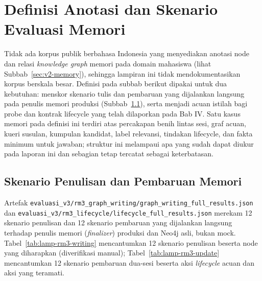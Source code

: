 \section{Definisi Anotasi dan Skenario Evaluasi Memori}
\label{lamp:v2-memory-gold}

Tidak ada korpus publik berbahasa Indonesia yang menyediakan anotasi node dan relasi \textit{knowledge graph} memori pada domain mahasiswa (lihat Subbab~\ref{sec:v2-memory}), sehingga lampiran ini tidak mendokumentasikan korpus berskala besar. Definisi pada subbab berikut dipakai untuk dua kebutuhan: menskor skenario tulis dan pembaruan yang dijalankan langsung pada penulis memori produksi (Subbab~\ref{lamp:v2-memory-scenarios}), serta menjadi acuan istilah bagi probe dan kontrak lifecycle yang telah dilaporkan pada Bab IV. Satu kasus memori pada definisi ini terdiri atas percakapan benih lintas sesi, graf acuan, kueri susulan, kumpulan kandidat, label relevansi, tindakan lifecycle, dan fakta minimum untuk jawaban; struktur ini melampaui apa yang sudah dapat diukur pada laporan ini dan sebagian tetap tercatat sebagai keterbatasan.

\subsection{Skenario Penulisan dan Pembaruan Memori}
\label{lamp:v2-memory-scenarios}

Artefak \texttt{evaluasi\_v3/rm3\_graph\_writing/graph\_writing\_full\_results.json} dan \texttt{evaluasi\_v3/rm3\_lifecycle/lifecycle\_full\_results.json} merekam 12 skenario penulisan dan 12 skenario pembaruan yang dijalankan langsung terhadap penulis memori (\textit{finalizer}) produksi dan Neo4j asli, bukan mock. Tabel~\ref{tab:lamp-rm3-writing} mencantumkan 12 skenario penulisan beserta node yang diharapkan (diverifikasi manual); Tabel~\ref{tab:lamp-rm3-update} mencantumkan 12 skenario pembaruan dua-sesi beserta aksi \textit{lifecycle} acuan dan aksi yang teramati.

